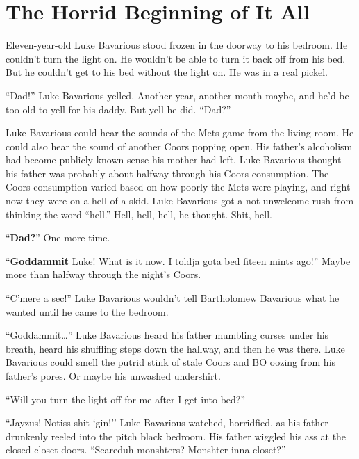 \chapter{The Horrid Beginning of It All}


Eleven-year-old Luke Bavarious stood frozen in the doorway to his
bedroom. He couldn't turn the light on. He wouldn't be
able to turn it back off from his bed. But he couldn't get to
his bed without the light on. He was in a real pickel.



``Dad!'' Luke Bavarious yelled. Another year, another
month maybe, and he'd be too old to yell for his daddy. But
yell he did. ``Dad?''



Luke Bavarious could hear the sounds of the Mets game from the
living room. He could also hear the sound of another Coors popping
open. His father's alcoholism had become publicly known sense
his mother had left. Luke Bavarious thought his father was probably
about halfway through his Coors consumption. The Coors consumption
varied based on how poorly the Mets were playing, and right now
they were on a hell of a skid. Luke Bavarious got a not-unwelcome
rush from thinking the word ``hell.'' Hell, hell, hell,
he thought. Shit, hell.



``{\bf Dad?}'' One more time.



``{\bf Goddammit} Luke! What is it now. I toldja gota bed fiteen
mints ago!'' Maybe more than halfway through the night's
Coors.



``C'mere a sec!'' Luke Bavarious wouldn't
tell Bartholomew Bavarious what he wanted until he came to the
bedroom.



``Goddammit{\ldots}'' Luke Bavarious heard his father
mumbling curses under his breath, heard his shuffling steps down
the hallway, and then he was there. Luke Bavarious could smell the
putrid stink of stale Coors and BO oozing from his father's pores.
Or maybe his unwashed undershirt.



``Will you turn the light off for me after I get into
bed?''



``Jayzus! Notiss shit `gin!'' Luke Bavarious
watched, horridfied, as his father drunkenly reeled into the pitch
black bedroom. His father wiggled his ass at the closed closet
doors. ``Scareduh monshters? Monshter inna
closet?''



